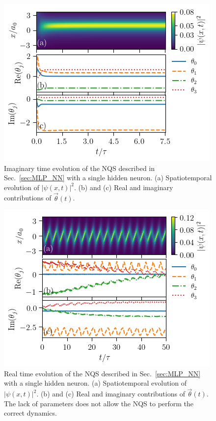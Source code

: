 \documentclass[aps,pre,superscriptaddress,amsmath,amssymb,amsfonts,twocolumn,showpacs,notitlepage]{revtex4-1}
\begin{document}
	\begin{figure} 
		\centering
		\includegraphics[width=\columnwidth]{NQS_1-1-1_imag.png}
		\caption{
			Imaginary time evolution of the NQS described in Sec.~\ref{sec:MLP_NN} with a single hidden neuron.
			(a) Spatiotemporal evolution of $|\psi(x,t)|^2$. 
			(b) and (c) Real and imaginary contributions of $\vec{\theta}(t)$.
		}
		\label{fig:NQS_1-1-1_imag}
	\end{figure}
	\begin{figure} 
		\centering
		\includegraphics[width=\columnwidth]{NQS_1-1-1_real.png}
		\caption{
			Real time evolution of the NQS described in Sec.~\ref{sec:MLP_NN} with a single hidden neuron.
			(a) Spatiotemporal evolution of $|\psi(x,t)|^2$. 
			(b) and (c) Real and imaginary contributions of $\vec{\theta}(t)$.
			The lack of parameters does not allow the NQS to perform the correct dynamics.
		}
		\label{fig:NQS_1-1-1_real}
	\end{figure}
	
\end{document}
